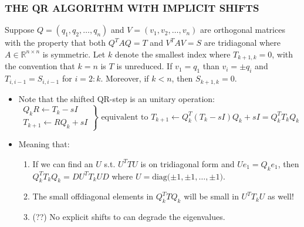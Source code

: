 \documentclass[a4paper,8pt]{beamer} %
\newcommand{\diag}[1]{\text{diag}{#1}}
\begin{document}
\begin{frame} %
	\frametitle{THE QR ALGORITHM WITH IMPLICIT SHIFTS}
		\begin{theorem}
			\begin{footnotesize}
				Suppose $Q=(q_1,q_2,\dots,q_n)$ and $V=(v_1,v_2,\dots,v_n)$ are orthogonal matrices with the property
				that both $Q^TAQ=T$ and $V^TAV=S$ are tridiagonal where $A\in\mathbb R^{n\times n}$ is symmetric.
				Let $k$ denote the smallest index where $T_{k+1,k}=0$, with the convention that $k=n$ is $T$ is 
				unreduced. If $v_1=q_1$ than $v_i=\pm q_i$ and $T_{i,i-1} = S_{i,i-1}$ for $i=2:k$. Moreover, if
				$k<n$, then $S_{k+1,k}=0$.
			\end{footnotesize}
		\end{theorem}
		\begin{itemize}
				\item
		Note that the shifted QR-step is an unitary operation:
		\begin{equation}
			\left.
			\begin{matrix}
				Q_kR\gets T_{k}-sI\\
				T_{k+1}\gets RQ_k + sI
			\end{matrix}
			\right\} \text{ equivalent to }  T_{k+1} \gets Q_k^T (T_k - s I ) Q_k + sI =  Q_k^T T_k Q_k 
		\end{equation}
	\item Meaning that:
		\begin{enumerate}
			\item If we can find an $U$ s.t. $U^TTU$ is on tridiagonal form and $Ue_1=Q_ke_1$, then
				$Q_k^TT_kQ_k = DU^TT_kUD$ where $U=\diag(\pm1,\pm1,\dots,\pm1)$.
			\item The small offdiagonal elements in $Q_k^{T}TQ_k$ will be small in $U^{T}T_kU$ as well!
			\item (??) No explicit shifts to can degrade the eigenvalues.
		\end{enumerate}
		\end{itemize}
\end{frame} %
\end{document}
